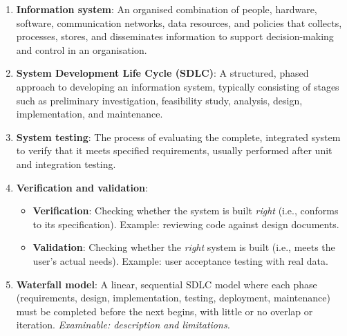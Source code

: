 \documentclass[11pt]{article}
\begin{document}
\begin{corrige}
\begin{enumerate}
\item \textbf{Information system}: An organised combination of people, hardware, software, communication networks, data resources, and policies that collects, processes, stores, and disseminates information to support decision-making and control in an organisation.
\item \textbf{System Development Life Cycle (SDLC)}: A structured, phased approach to developing an information system, typically consisting of stages such as preliminary investigation, feasibility study, analysis, design, implementation, and maintenance.
\item \textbf{System testing}: The process of evaluating the complete, integrated system to verify that it meets specified requirements, usually performed after unit and integration testing.
\item \textbf{Verification and validation}:
\begin{itemize}
\item \textbf{Verification}: Checking whether the system is built \emph{right} (i.e., conforms to its specification). Example: reviewing code against design documents.
\item \textbf{Validation}: Checking whether the \emph{right} system is built (i.e., meets the user's actual needs). Example: user acceptance testing with real data.
\end{itemize}
\item \textbf{Waterfall model}: A linear, sequential SDLC model where each phase (requirements, design, implementation, testing, deployment, maintenance) must be completed before the next begins, with little or no overlap or iteration. \emph{Examinable: description and limitations.}
\end{enumerate}
\end{corrige}
\end{document}
